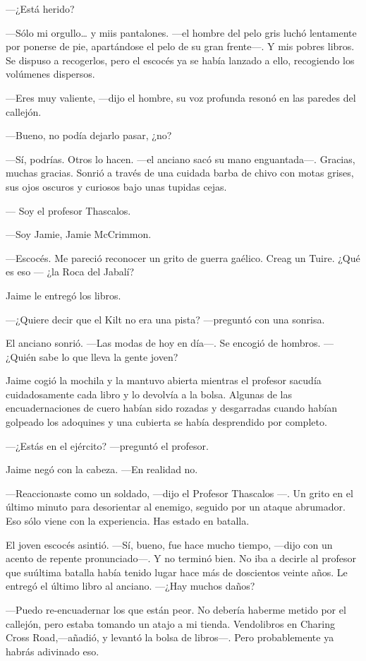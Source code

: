 ---¿Está herido?

---Sólo mi orgullo\ldots{} y miis pantalones. ---el hombre del
pelo gris luchó lentamente por ponerse de pie, apartándose el pelo de su
gran frente---. Y mis pobres libros. Se dispuso a recogerlos, pero el
escocés ya se había lanzado a ello, recogiendo los volúmenes dispersos.

---Eres muy valiente, ---dijo el hombre, su voz profunda resonó
en las paredes del callejón.

---Bueno, no podía dejarlo pasar, ¿no?

---Sí, podrías. Otros lo hacen. ---el anciano sacó su mano
enguantada---. Gracias, muchas gracias. Sonrió a través de una cuidada
barba de chivo con motas grises, sus ojos oscuros y curiosos bajo unas
tupidas cejas.

--- Soy el profesor Thascalos.

---Soy Jamie, Jamie McCrimmon.

---Escocés. Me pareció reconocer un grito de guerra gaélico.
Creag un Tuire. ¿Qué es eso --- ¿la Roca del Jabalí?

Jaime le entregó los libros.

---¿Quiere decir que el Kilt no era una pista? ---preguntó con
una sonrisa.

El anciano sonrió. ---Las modas de hoy en día---. Se encogió de
hombros. ---¿Quién sabe lo que lleva la gente joven?

Jaime cogió la mochila y la mantuvo abierta mientras el profesor
sacudía cuidadosamente cada libro y lo devolvía a la bolsa. Algunas de
las encuadernaciones de cuero habían sido rozadas y desgarradas cuando
habían golpeado los adoquines y una cubierta se había desprendido por
completo.

---¿Estás en el ejército? ---preguntó el profesor.

Jaime negó con la cabeza. ---En realidad no.

---Reaccionaste como un soldado, ---dijo el Profesor Thascalos
---. Un grito en el último minuto para desorientar al enemigo, seguido
por un ataque abrumador. Eso sólo viene con la experiencia. Has estado
en batalla.

El joven escocés asintió. ---Sí, bueno, fue hace mucho tiempo,
---dijo con un acento de repente pronunciado---. Y no terminó bien. No
iba a decirle al profesor que suúltima batalla había tenido lugar hace
más de doscientos veinte años. Le entregó el último libro al anciano.
---¿Hay muchos daños?

---Puedo re-encuadernar los que están peor. No debería haberme
metido por el callejón, pero estaba tomando un atajo a mi tienda.
Vendolibros en Charing Cross Road,---añadió, y levantó la bolsa de
libros---. Pero probablemente ya habrás adivinado eso.

